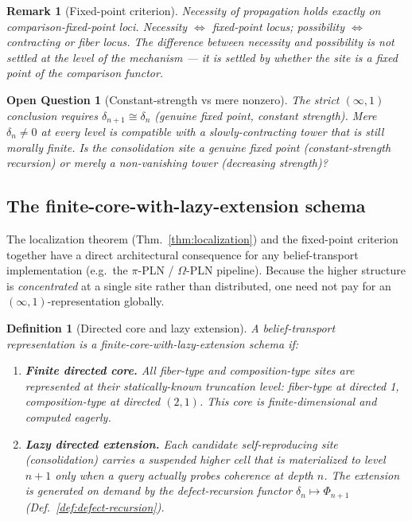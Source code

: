 \documentclass[11pt]{article}
\newtheorem{definition}{Definition}
\newtheorem{remark}{Remark}
\newtheorem{openquestion}{Open Question}
\begin{document}
\begin{remark}[Fixed-point criterion]
Necessity of propagation holds exactly on comparison-fixed-point loci.
Necessity $\Leftrightarrow$ fixed-point locus; possibility $\Leftrightarrow$ contracting or fiber locus.
The difference between necessity and possibility is not settled at the level of the mechanism
--- it is settled by whether the site is a fixed point of the comparison functor.
\end{remark}

\begin{openquestion}[Constant-strength vs mere nonzero]
\label{oq:constant-strength}
The strict $(\infty,1)$ conclusion requires $\delta_{n+1} \cong \delta_n$ (genuine fixed point,
constant strength). Mere $\delta_n \neq 0$ at every level is compatible with a slowly-contracting
tower that is still morally finite. Is the consolidation site a genuine fixed point
(constant-strength recursion) or merely a non-vanishing tower (decreasing strength)?
\end{openquestion}

\subsection{The finite-core-with-lazy-extension schema}

The localization theorem (Thm.~\ref{thm:localization}) and the fixed-point criterion together
have a direct architectural consequence for any belief-transport implementation (e.g.\ the
$\pi$-PLN / $\Omega$-PLN pipeline). Because the higher structure is \emph{concentrated} at a
single site rather than distributed, one need not pay for an $(\infty,1)$-representation globally.

\begin{definition}[Directed core and lazy extension]
\label{def:finite-core}
A belief-transport representation is a \emph{finite-core-with-lazy-extension} schema if:
\begin{enumerate}
  \item \textbf{Finite directed core.} All fiber-type and composition-type sites are represented
  at their statically-known truncation level: fiber-type at directed 1, composition-type at
  directed $(2,1)$. This core is finite-dimensional and computed eagerly.
  \item \textbf{Lazy directed extension.} Each candidate self-reproducing site (consolidation)
  carries a \emph{suspended} higher cell that is materialized to level $n+1$ only when a query
  actually probes coherence at depth $n$. The extension is generated on demand by the
  defect-recursion functor $\delta_n \mapsto \Phi_{n+1}$ (Def.~\ref{def:defect-recursion}).
\end{enumerate}
\end{definition}
\end{document}
